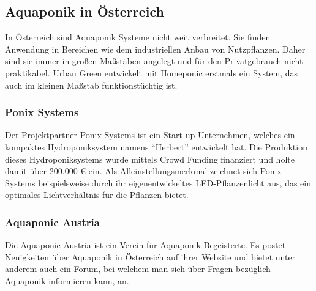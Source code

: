 \subsection{Aquaponik in Österreich}
In Österreich sind Aquaponik Systeme nicht weit verbreitet. Sie finden Anwendung in Bereichen wie dem industriellen Anbau von Nutzpflanzen. Daher sind sie immer in großen Maßstäben angelegt und für den Privatgebrauch nicht praktikabel. Urban Green entwickelt mit Homeponic erstmals ein System, das auch im kleinen Maßstab funktionstüchtig ist.
\subsubsection{Ponix Systems}
Der Projektpartner Ponix Systems \cite{PonixSystems} ist ein Start-up-Unternehmen, welches ein kompaktes Hydroponiksystem namens "`Herbert"' entwickelt hat. Die Produktion dieses Hydroponiksystems wurde mittels Crowd Funding finanziert und holte damit über 200.000 € ein. Als Alleinstellungsmerkmal zeichnet sich Ponix Systems beispielsweise durch ihr eigenentwickeltes \gls{LED}-Pflanzenlicht aus, das ein optimales Lichtverhältnis für die Pflanzen bietet.
\subsubsection{Aquaponic Austria}
Die Aquaponic Austria \cite{AquaponikAustria} ist ein Verein für Aquaponik Begeisterte. Es postet Neuigkeiten über Aquaponik in Österreich auf ihrer Website und bietet unter anderem auch ein Forum, bei welchem man sich über Fragen bezüglich Aquaponik informieren kann, an.